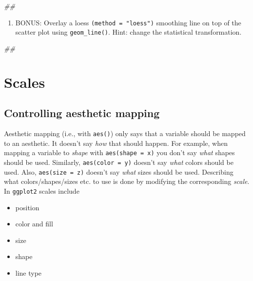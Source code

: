 \documentclass[
]{book}
\newenvironment{Shaded}{\begin{snugshade}}{\end{snugshade}}
\newcommand{\CommentTok}[1]{\textcolor[rgb]{0.56,0.35,0.01}{\textit{#1}}}
\providecommand{\tightlist}{%
  \setlength{\itemsep}{0pt}\setlength{\parskip}{0pt}}
\begin{document}
\begin{Shaded}
\begin{Highlighting}[]
\CommentTok{## }
\end{Highlighting}
\end{Shaded}

\begin{enumerate}
\def\labelenumi{\arabic{enumi}.}
\setcounter{enumi}{4}
\tightlist
\item
  BONUS: Overlay a loess \texttt{(method\ =\ "loess")} smoothing line on top of the scatter plot using \texttt{geom\_line()}. Hint: change the statistical transformation.
\end{enumerate}

\begin{Shaded}
\begin{Highlighting}[]
\CommentTok{## }
\end{Highlighting}
\end{Shaded}

\hypertarget{scales}{%
\section{Scales}\label{scales}}

\hypertarget{controlling-aesthetic-mapping}{%
\subsection{Controlling aesthetic mapping}\label{controlling-aesthetic-mapping}}

Aesthetic mapping (i.e., with \texttt{aes()}) only says that a variable should be mapped to an aesthetic. It doesn't say \emph{how} that should happen. For example, when mapping a variable to \emph{shape} with \texttt{aes(shape\ =\ x)} you don't say \emph{what} shapes should be used. Similarly, \texttt{aes(color\ =\ y)} doesn't say \emph{what} colors should be used. Also, \texttt{aes(size\ =\ z)} doesn't say \emph{what} sizes should be used. Describing what colors/shapes/sizes etc. to use is done by modifying the corresponding \emph{scale}. In \texttt{ggplot2} scales include

\begin{itemize}
\tightlist
\item
  position
\item
  color and fill
\item
  size
\item
  shape
\item
  line type
\end{itemize}
\end{document}
